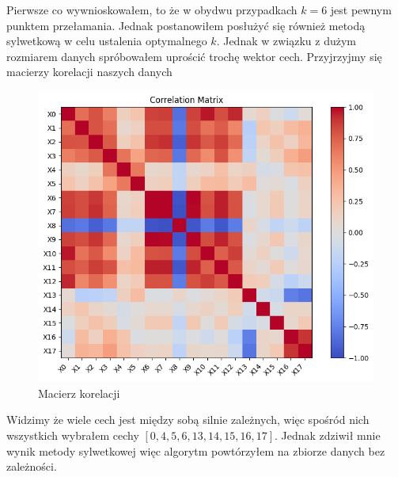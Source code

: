 \documentclass[polish,12pt,a4paper]{extarticle}
\begin{document}
\noindent Pierwsze co wywnioskowałem, to że w obydwu przypadkach $k = 6$ jest pewnym punktem przełamania. Jednak postanowiłem posłużyć się również metodą sylwetkową w celu ustalenia optymalnego $k$. Jednak w związku z dużym rozmiarem danych spróbowałem uprościć trochę wektor cech. Przyjrzyjmy się macierzy korelacji naszych danych
\begin{figure}[h!]
\centering
        \includegraphics[width=0.4\linewidth]{img/corr.png}
        \captionsetup{labelformat=empty}
        \caption{Macierz korelacji}
\end{figure} \FloatBarrier
Widzimy że wiele cech jest między sobą silnie zależnych, więc spośród nich wszystkich wybrałem cechy $[0, 4, 5, 6, 13, 14, 15, 16, 17]$. Jednak zdziwił mnie wynik metody sylwetkowej więc algorytm powtórzyłem na zbiorze danych bez zależności.
\end{document}
